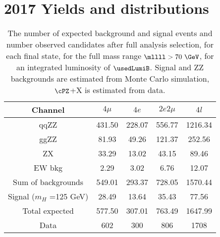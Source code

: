 \section{2017 Yields and distributions}

\begin{table}[htb]
	\begin{center}
		\small
		\caption{The number of expected background and signal events 
			and number observed candidates after full analysis selection, for each final state, 
			for the full mass range $\mllll>70~\GeV$, for an integrated luminosity of $\usedLumiB$.
			Signal and ZZ backgrounds are estimated from Monte Carlo simulation,
			$\cPZ$+X is estimated from data.
			\label{tab:EventYieldsB}}
		
		\begin{tabular}{|c|c|c|c|c|}
	\hline
	\hline
	\textbf{Channel} & $4\mu$ & $4 e$ & $2e2\mu$ & $4l$ \\
	\hline
	qqZZ     &431.50         &228.07         &556.77         &1216.34        \\
	ggZZ     &81.93  &49.26  &121.37         &252.56         \\
	ZX       &33.29  &13.02  &43.15  &89.46  \\
	EW bkg   &2.29   &3.02   &6.76   &12.07  \\
	\hline
	Sum of backgrounds       &549.01         &293.37         &728.05         &1570.44        \\
	\hline
	Signal ($m_{H}$ =125 GeV)        &28.49  &13.64  &35.43  &77.56  \\
	\hline
	Total expected   &577.50        &307.01 &763.49 &1647.99         \\
	\hline
	Data     &602    &300    &806    &1708   \\
	\hline
	\hline
\end{tabular}

\end{center}
\end{table}




